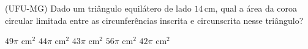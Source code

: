 \noindent\parbox{\linewidth}{

(UFU-MG) Dado um triângulo equilátero de lado $14$\,cm, qual a área da coroa circular limitada entre as circunferências inscrita e circunscrita nesse triângulo?

$49\pi$ cm$^2$
$44\pi$ cm$^2$
$43\pi$ cm$^2$
$56\pi$ cm$^2$
$42\pi$ cm$^2$



}


